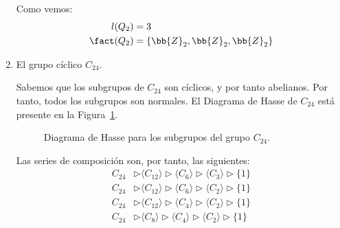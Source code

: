 \begin{ejercicio}
\begin{enumerate}
        Como vemos:
        \begin{align*}
            l(Q_2) &= 3 \\
            \fact(Q_2) &= \{\bb{Z}_2, \bb{Z}_2, \bb{Z}_2\}
        \end{align*}
        \item El grupo cíclico $C_{24}$.
        
        Sabemos que los subgrupos de $C_{24}$ son cíclicos, y por tanto abelianos. Por tanto, todos los subgrupos son normales. El Diagrama de Hasse de $C_{24}$ está presente en la Figura~\ref{fig:Hasse_C24}.
        \begin{figure}
            \centering
            \caption{Diagrama de Hasse para los subgrupos del grupo $C_{24}$.}
            \label{fig:Hasse_C24}
        \end{figure}
        
        Las series de composición son, por tanto, las siguientes:
        \begin{align*}
            C_{24} &\rhd \langle C_{12} \rangle \rhd \langle C_{6} \rangle \rhd \langle C_{3} \rangle \rhd \{1\} \\
            C_{24} &\rhd \langle C_{12} \rangle \rhd \langle C_{6} \rangle \rhd \langle C_{2} \rangle \rhd \{1\} \\
            C_{24} &\rhd \langle C_{12} \rangle \rhd \langle C_{4} \rangle \rhd \langle C_{2} \rangle \rhd \{1\} \\
            C_{24} &\rhd \langle C_{8} \rangle \rhd \langle C_{4} \rangle \rhd \langle C_{2} \rangle \rhd \{1\}
        \end{align*}


\end{enumerate}
\end{ejercicio}

